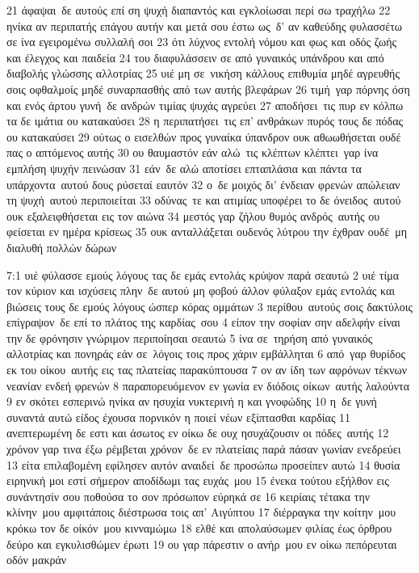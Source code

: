 \documentclass[10pt,oneside,footinclude=true,headinclude=true]{scrbook} %
\begin{document}
21 άφαψαι δε αυτούς επί ση ψυχή διαπαντός και εγκλοίωσαι περί σω τραχήλω
22 ηνίκα αν περιπατής επάγου αυτήν και μετά σου έστω ως δ' αν καθεύδης φυλασσέτω σε ίνα εγειρομένω συλλαλή σοι
23 ότι λύχνος εντολή νόμου και φως και οδός ζωής και έλεγχος και παιδεία
24 του διαφυλάσσειν σε από γυναικός υπάνδρου και από διαβολής γλώσσης αλλοτρίας
25 υιέ μη σε νικήση κάλλους επιθυμία μηδέ αγρευθής σοις οφθαλμοίς μηδέ συναρπασθής από των αυτής βλεφάρων
26 τιμή γαρ πόρνης όση και ενός άρτου γυνή δε ανδρών τιμίας ψυχάς αγρεύει
27 αποδήσει τις πυρ εν κόλπω τα δε ιμάτια ου κατακαύσει
28 η περιπατήσει τις επ' ανθράκων πυρός τους δε πόδας ου κατακαύσει
29 ούτως ο εισελθών προς γυναίκα ύπανδρον ουκ αθωωθήσεται ουδέ πας ο απτόμενος αυτής
30 ου θαυμαστόν εάν αλώ τις κλέπτων κλέπτει γαρ ίνα εμπλήση ψυχήν πεινώσαν
31 εάν δε αλώ αποτίσει επταπλάσια και πάντα τα υπάρχοντα αυτού δους ρύσεταί εαυτόν
32 ο δε μοιχός δι' ένδειαν φρενών απώλειαν τη ψυχή αυτού περιποιείται
33 οδύνας τε και ατιμίας υποφέρει το δε όνειδος αυτού ουκ εξαλειφθήσεται εις τον αιώνα
34 μεστός γαρ ζήλου θυμός ανδρός αυτής ου φείσεται εν ημέρα κρίσεως
35 ουκ ανταλλάξεται ουδενός λύτρου την έχθραν ουδέ μη διαλυθή πολλών δώρων
\par
7:1 υιέ φύλασσε εμούς λόγους τας δε εμάς εντολάς κρύψον παρά σεαυτώ
2 υιέ τίμα τον κύριον και ισχύσεις πλην δε αυτού μη φοβού άλλον φύλαξον εμάς εντολάς και βιώσεις τους δε εμούς λόγους ώσπερ κόρας ομμάτων
3 περίθου αυτούς σοις δακτύλοις επίγραψον δε επί το πλάτος της καρδίας σου
4 είπον την σοφίαν σην αδελφήν είναι την δε φρόνησιν γνώριμον περιποίησαι σεαυτώ
5 ίνα σε τηρήση από γυναικός αλλοτρίας και πονηράς εάν σε λόγοις τοις προς χάριν εμβάλληται
6 από γαρ θυρίδος εκ του οίκου αυτής εις τας πλατείας παρακύπτουσα
7 ον αν ίδη των αφρόνων τέκνων νεανίαν ενδεή φρενών
8 παραπορευόμενον εν γωνία εν διόδοις οίκων αυτής λαλούντα
9 εν σκότει εσπερινώ ηνίκα αν ησυχία νυκτερινή η και γνοφώδης
10 η δε γυνή συναντά αυτώ είδος έχουσα πορνικόν η ποιεί νέων εξίπτασθαι καρδίας
11 ανεπτερωμένη δε εστι και άσωτος εν οίκω δε ουχ ησυχάζουσιν οι πόδες αυτής
12 χρόνον γαρ τινα έξω ρέμβεται χρόνον δε εν πλατείαις παρά πάσαν γωνίαν ενεδρεύει
13 είτα επιλαβομένη εφίλησεν αυτόν αναιδεί δε προσώπω προσείπεν αυτώ
14 θυσία ειρηνική μοι εστί σήμερον αποδίδωμι τας ευχάς μου
15 ένεκα τούτου εξήλθον εις συνάντησίν σου ποθούσα το σον πρόσωπον εύρηκά σε
16 κειρίαις τέτακα την κλίνην μου αμφιτάποις διέστρωσα τοις απ' Αιγύπτου
17 διέρραγκα την κοίτην μου κρόκω τον δε οίκόν μου κινναμώμω
18 ελθέ και απολαύσωμεν φιλίας έως όρθρου δεύρο και εγκυλισθώμεν έρωτι
19 ου γαρ πάρεστιν ο ανήρ μου εν οίκω πεπόρευται οδόν μακράν
\end{document}
